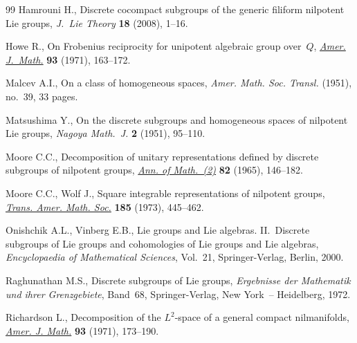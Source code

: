 \documentclass[pdftex]{sigma}
\begin{document}
\begin{thebibliography}{99}
Hamrouni H.,
Discrete cocompact subgroups  of  the generic f\/iliform nilpotent Lie groups,
{\it  J.~Lie Theory} \textbf{18} (2008), 1--16.

Howe R.,
On Frobenius reciprocity for unipotent algebraic group over~$Q$,
\href{http://dx.doi.org/10.2307/2373455}{{\it Amer. J.~Math.}} \textbf{93} (1971), 163--172.

Malcev A.I.,
On a class of homogeneous spaces,
{\it Amer. Math. Soc. Transl.}   (1951), no.~39, 33 pages.

Matsushima Y.,
On the discrete subgroups and homogeneous spaces of nilpotent Lie groups,
{\it  Nagoya Math.~J.} \textbf{2} (1951), 95--110.


Moore C.C.,
Decomposition of unitary representations def\/ined by discrete subgroups of nilpotent  groups,
\href{http://dx.doi.org/10.2307/1970567}{{\it Ann. of Math.~(2)}} \textbf{82} (1965), 146--182.



Moore C.C., Wolf J.,
Square integrable  representations  of nilpotent groups,
\href{http://dx.doi.org/10.2307/1996450}{{\it Trans. Amer.  Math. Soc.}} \textbf{185} (1973), 445--462.

Onishchik A.L., Vinberg E.B.,
Lie groups and Lie algebras. II.~Discrete subgroups of Lie groups and cohomologies of Lie groups and Lie algebras,
{\it Encyclopaedia of Mathematical Sciences}, Vol.~21, Springer-Verlag, Berlin, 2000.

Raghunathan M.S.,
Discrete subgroups of Lie groups,
{\it Ergebnisse der Mathematik und ihrer Grenzgebiete}, Band~68, Springer-Verlag, New York~-- Heidelberg, 1972.

Richardson L.,
Decomposition of the $L^2$-space of a general compact nilmanifolds,
\href{http://dx.doi.org/10.2307/2373456}{{\it Amer. J. Math.}} \textbf{93} (1971), 173--190.


\end{thebibliography}\LastPageEnding
\end{document}
